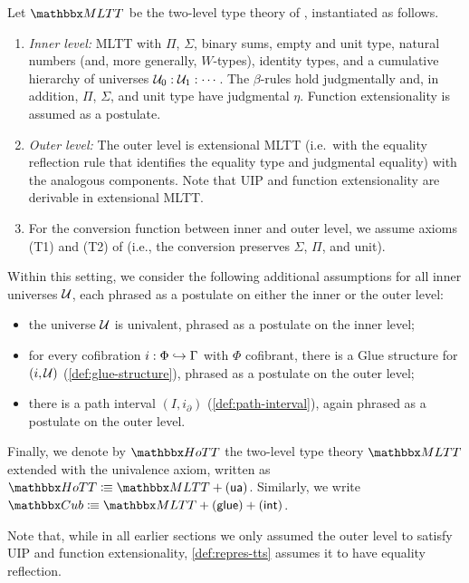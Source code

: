 \begin{definition}\label{def:repres-tts}
	Let $\bbMLTT$ be the two-level type theory of
	\citet{2LTT}, instantiated as follows.
	\begin{enumerate}[noitemsep]
		\item \emph{Inner level:} MLTT with $\Pi$, $\Sigma$, binary sums,
		empty and unit type, natural numbers (and, more generally, $W$-types), identity types, and a
		cumulative hierarchy of universes $\mathcal{U}_0:\mathcal{U}_1:\cdots$.
		The $\beta$-rules hold judgmentally and, in addition, $\Pi$, $\Sigma$, and unit type have judgmental $\eta$.
		Function extensionality is assumed as a postulate.
		\item \emph{Outer level:} The outer level is extensional MLTT (i.e.\ with the equality reflection rule that identifies the equality type and judgmental equality) with the analogous components. Note that UIP and function extensionality are derivable in extensional MLTT.
		\item For the conversion function between inner and outer level, we assume axioms (T1) and (T2) of \cite{2LTT} (i.e., the conversion preserves $\Sigma$, $\Pi$, and unit).
	\end{enumerate}
	Within this setting, we consider the following additional assumptions for all inner universes $\mathcal{U}$, each phrased as a postulate on either the inner or the outer level:
	\begin{itemize}[noitemsep]
		\item[$\axUA$] the universe $\mathcal{U}$ is univalent, phrased as a postulate on the inner level;
		\item[$\axGlue$] for every cofibration $i:\Phi\hookrightarrow\Gamma$ with $\Phi$ cofibrant, there is a Glue structure for $(i,\mathcal{U})$ (\cref{def:glue-structure}), phrased as a postulate on the outer level;
		\item[$\axInt$] there is a path interval $(I,i_\partial)$ (\cref{def:path-interval}), again phrased as a postulate on the outer level.
	\end{itemize}
	Finally, we denote by $\bbHoTT$ the two-level type theory $\bbMLTT$ extended with the univalence axiom, written as $\bbHoTT \defeq \bbMLTT + \axUA$.
	Similarly, we write $\bbCub \defeq \bbMLTT + \axGlue + \axInt$.
\end{definition}
Note that, while in all earlier sections we only assumed the outer level to satisfy UIP and function extensionality, \cref{def:repres-tts} assumes it to have equality reflection.
